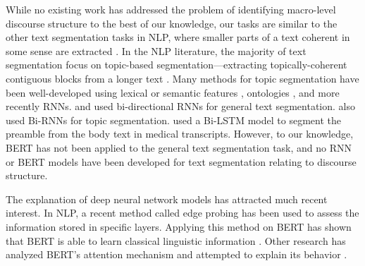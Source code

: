 While no existing work has addressed the problem of identifying macro-level discourse structure to the best of our knowledge, our tasks are similar to the other text segmentation tasks in NLP, where smaller parts of a text coherent in some sense are extracted \cite{pak2018text}. In the NLP literature, the majority of text segmentation focus on topic-based segmentation---extracting topically-coherent contiguous blocks from a longer text \cite{li2018segbot}. Many methods for topic segmentation have been well-developed using lexical or semantic features \cite{hearst1997texttiling, choi2000advances}, ontologies \cite{bayomi2015ontoseg}, and more recently RNNs. \citet{badjatiya2018attention} and \citet{li2018segbot} used bi-directional RNNs for general text segmentation. \citet{sehikh2017topic} also used Bi-RNNs for topic segmentation. \citet{salloum2017automated} used a Bi-LSTM model to segment the preamble from the body text in medical transcripts. However, to our knowledge, BERT has not been applied to the general text segmentation task, and no RNN or BERT models have been developed for text segmentation relating to discourse structure.

The explanation of deep neural network models has attracted much recent interest. In NLP, a recent method called edge probing \cite{tenney2019you} has been used to assess the information stored in specific layers. Applying this method on BERT has shown that BERT is able to learn classical linguistic information \cite{jawahar2019does}. Other research has analyzed BERT's attention mechanism and attempted to explain its behavior \cite{van2019does, clark2019does, wiegreffe2019attention, voita2019analyzing, jain2019attention}.



